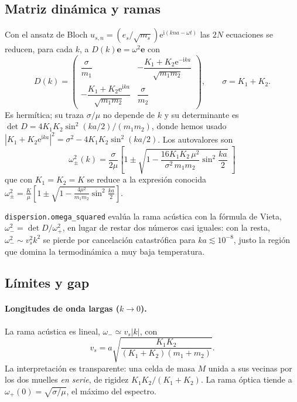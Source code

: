 \documentclass[11pt,a4paper]{article}
\newcommand{\ii}{\mathrm{i}}
\newcommand{\ee}{\mathrm{e}}
\newcommand{\vs}{v_{s}}
\newcommand{\code}[1]{\texttt{#1}}
\begin{document}
\subsection{Matriz dinámica y ramas}

Con el ansatz de Bloch $u_{s,n}=(e_s/\sqrt{m_s})\ee^{\ii(kna-\omega t)}$ las
$2N$ ecuaciones se reducen, para cada $k$, a $D(k)\bm e=\omega^2\bm e$ con
\begin{equation}
D(k)=\begin{pmatrix}
\dfrac{\sigma}{m_1} & -\dfrac{K_1+K_2\ee^{-\ii ka}}{\sqrt{m_1m_2}}\\[10pt]
-\dfrac{K_1+K_2\ee^{\ii ka}}{\sqrt{m_1m_2}} & \dfrac{\sigma}{m_2}
\end{pmatrix},\qquad \sigma=K_1+K_2 .
\end{equation}
Es hermítica; su traza $\sigma/\mu$ no depende de $k$ y su determinante es
$\det D=4K_1K_2\sin^2(ka/2)/(m_1m_2)$, donde hemos usado
$|K_1+K_2\ee^{\ii ka}|^2=\sigma^2-4K_1K_2\sin^2(ka/2)$. Los autovalores son
\begin{equation}
\boxed{\;\omega_\pm^2(k)=\frac{\sigma}{2\mu}\left[1\pm\sqrt{1-\frac{16K_1K_2\,\mu^2}{\sigma^2\,m_1m_2}\sin^2\frac{ka}{2}}\;\right]\;}
\end{equation}
que con $K_1=K_2=K$ se reduce a la expresión conocida
$\omega_\pm^2=\frac{K}{\mu}\left[1\pm\sqrt{1-\frac{4\mu^2}{m_1m_2}\sin^2\frac{ka}{2}}\right]$.

\begin{codigo}
\code{dispersion.omega\_squared} evalúa la rama acústica con la fórmula de
Vieta, $\omega_-^2=\det D/\omega_+^2$, en lugar de restar dos números casi
iguales: con la resta, $\omega_-^2\sim\vs^2k^2$ se pierde por cancelación
catastrófica para $ka\lesssim10^{-8}$, justo la región que domina la
termodinámica a muy baja temperatura.
\end{codigo}

\subsection{Límites y gap}

\paragraph{Longitudes de onda largas ($k\to0$).} La rama acústica es lineal,
$\omega_-\simeq\vs|k|$, con
\begin{equation}
\vs=a\sqrt{\frac{K_1K_2}{(K_1+K_2)(m_1+m_2)}} .
\end{equation}
La interpretación es transparente: una celda de masa $M$ unida a sus vecinas
por los dos muelles \emph{en serie}, de rigidez $K_1K_2/(K_1+K_2)$. La rama
óptica tiende a $\omega_+(0)=\sqrt{\sigma/\mu}$, el máximo del espectro.
\end{document}
